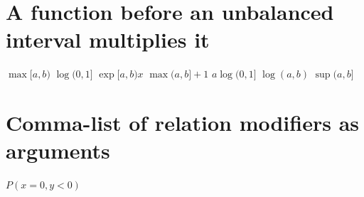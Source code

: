 \documentclass{article}
\begin{document}
\section{A function before an unbalanced interval multiplies it}
$\max[a,b)$ $\log(0,1]$ $\exp[a,b)x$ $\max(a,b]+1$ $a\log(0,1]$ $\log(a,b)$ $\sup(a,b]$


\section{Comma-list of relation modifiers as arguments}
$ P(x = 0, y < 0) $

\end{document}
